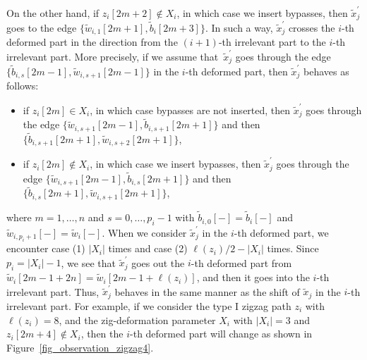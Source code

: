 \documentclass[11pt]{article}
\numberwithin{equation}{section}
\numberwithin{equation}{section}
\numberwithin{figure}{section}
\numberwithin{table}{section}
\begin{document}
\begin{observation}
On the other hand, if $z_i[2m+2]\not\in X_i$, in which case we insert bypasses, then $\widetilde{x}^\prime_j$ goes to the edge $\big\{\widetilde{w}_{i,1}[2m+1], \widetilde{b}_i[2m+3]\big\}$.
In such a way, $\widetilde{x}^\prime_j$ crosses the $i$-th deformed part in the direction from the $(i+1)$-th irrelevant part to the $i$-th irrelevant part.
More precisely, if we assume that~$\widetilde{x}^\prime_j$ goes through the edge $\{\widetilde{b}_{i,s}[2m-1], \widetilde{w}_{i,s+1}[2m-1]\}$ in the $i$-th deformed part,
then $\widetilde{x}^\prime_j$ behaves as follows:
\begin{itemize}\itemsep=0pt
\item[(1)] if $z_i[2m]\in X_i$, in which case bypasses are not inserted, then $\widetilde{x}^\prime_j$ goes through the edge $\big\{\widetilde{w}_{i,s+1}[2m-1],\widetilde{b}_{i,s+1}[2m+1]\big\}$ and then $\big\{\widetilde{b}_{i,s+1}[2m+1], \widetilde{w}_{i,s+2}[2m+1]\big\}$,
\item[(2)] if $z_i[2m]\not\in X_i$, in which case we insert bypasses, then $\widetilde{x}^\prime_j$ goes through the edge $\big\{\widetilde{w}_{i,s+1}[2m-1], \widetilde{b}_{i,s}[2m+1]\big\}$ and then $\big\{\widetilde{b}_{i,s}[2m+1], \widetilde{w}_{i,s+1}[2m+1]\big\}$,
\end{itemize}
where $m=1,\dots,n$ and $s=0,\dots,p_i-1$ with $\widetilde{b}_{i,0}[-]=\widetilde{b}_i[-]$ and $\widetilde{w}_{i,p_i+1}[-]=\widetilde{w}_i[-]$.
When we consider $\widetilde{x}^\prime_j$ in the $i$-th deformed part, we encounter case (1) $|X_i|$ times and case (2) $\ell(z_i)/2-|X_i|$ times.
Since $p_i=|X_i|-1$, we see that $\widetilde{x}^\prime_j$ goes out the $i$-th deformed part from $\widetilde{w}_i[2m-1+2n]=\widetilde{w}_i[2m-1+\ell(z_i)]$,
and then it goes into the $i$-th irrelevant part.
Thus, $\widetilde{x}^\prime_j$ behaves in the same manner as the shift of $\widetilde{x}_j$ in the $i$-th irrelevant part.
For example, if we consider the type I zigzag path $z_i$ with $\ell(z_i)=8$, and the zig-deformation parameter $X_i$ with $|X_i|=3$ and $z_i[2m+4]\not\in X_i$, then the $i$-th deformed part will change as shown in Figure~\ref{fig_observation_zigzag4}.

\begin{figure}[h!]\centering
{}
\end{figure}
\end{observation}
\end{document}
